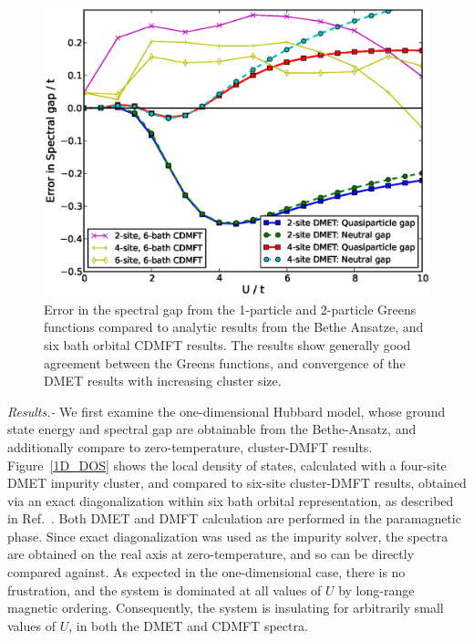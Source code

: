 \documentclass[aps,twocolumn,nobibnotes]{revtex4}
\begin{document}
\begin{figure}
\begin{center}
    \vspace{-2mm}
\includegraphics[scale=0.425]{Plots/1D_Gap/Hubbard_Gap.eps}
\end{center}
    \vspace{-8mm}
\caption{Error in the spectral gap from the 1-particle and 2-particle Greens functions compared to analytic results
from the Bethe Ansatze\cite{Ovchinni1970}, and six bath orbital CDMFT results\cite{Go2009}. The results show generally good agreement between the Greens functions, and 
convergence of the DMET results with increasing cluster size.}
\label{1D_GAP}
\end{figure}

\emph{Results.-} We first examine the one-dimensional Hubbard model, whose ground state energy\cite{Lieb68} and spectral gap\cite{Ovchinni1970} are 
obtainable from the Bethe-Ansatz, and additionally compare to
zero-temperature, cluster-DMFT results\cite{Go2009}. Figure~\ref{1D_DOS} shows the local density of states, calculated with a four-site DMET 
impurity cluster, and compared to six-site cluster-DMFT results, obtained via an exact diagonalization within six bath orbital representation, 
as described in Ref.~. Both DMET and DMFT calculation are performed in the paramagnetic phase. 
Since exact diagonalization was used as the impurity solver, 
the spectra are obtained on the real axis at zero-temperature, and so can be directly compared against. As expected in the one-dimensional case, there is no
frustration, and the system is dominated at all values of $U$ by long-range magnetic ordering\cite{Lieb68}. Consequently, 
the system is insulating for arbitrarily small values of $U$, in both the DMET and CDMFT spectra. 
\end{document}
